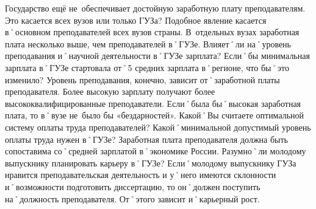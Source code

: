 \begin{drama}
	\michaelspeaks Государство ещё не~обеспечивает достойную заработную плату преподавателям. 
	\maxspeaks Это касается всех вузов или только ГУЗа?
	\michaelspeaks Подобное явление касается в˚основном преподавателей всех вузов страны. В~отдельных вузах заработная плата несколько выше, чем преподавателей в˚ГУЗе.
	\maxspeaks Влияет˚ли на˚уровень преподавания и˚научной деятельности в˚ГУЗе зарплата? Если˚бы минимальная зарплата в˚ГУЗе стартовала от˚5 средних зарплата в˚регионе, что бы˚это изменило?
	\michaelspeaks Уровень преподавания, конечно, зависит от˚заработной платы преподавателя. Более высокую зарплату получают более высококвалифицированные преподаватели. Если˚была бы˚высокая заработная плата, то в˚вузе не~было бы «бездарностей».
	\maxspeaks Какой˚Вы считаете оптимальной систему оплаты труда преподавателей? Какой˚минимальной допустимый уровень оплаты труда нужен в˚ГУЗе?
	\michaelspeaks Заработная плата преподавателя должна быть сопоставима со˚средней зарплатой в˚экономике России.
	\maxspeaks Разумно˚ли молодому выпускнику планировать карьеру в˚ГУЗе?
	\michaelspeaks Если˚молодому выпускнику ГУЗа нравится преподавательская деятельность и у˚него имеются склонности и˚возможности подготовить диссертацию, то он˚должен поступить на˚должность преподавателя. От˚этого зависит и˚карьерный рост.
	
	\pagebreak
	

\end{drama}
